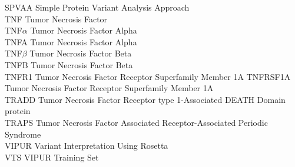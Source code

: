 SPVAA Simple Protein Variant Analysis Approach\\
TNF Tumor Necrosis Factor\\
TNF$\alpha$ Tumor Necrosis Factor Alpha\\
TNFA Tumor Necrosis Factor Alpha\\
TNF$\beta$ Tumor Necrosis Factor Beta\\
TNFB Tumor Necrosis Factor Beta\\
TNFR1 Tumor Necrosis Factor Receptor Superfamily Member 1A
TNFRSF1A Tumor Necrosis Factor Receptor Superfamily Member 1A\\
TRADD Tumor Necrosis Factor Receptor type 1-Associated DEATH Domain protein\\
TRAPS Tumor Necrosis Factor Associated Receptor-Associated Periodic Syndrome\\
VIPUR Variant Interpretation Using Rosetta\\
VTS VIPUR Training Set\\